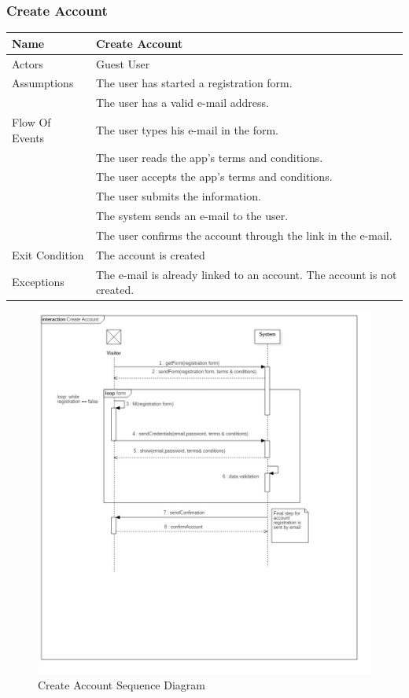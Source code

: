 \documentclass{article}
\begin{document}
\subsubsection{Create Account}
\begin{center}
\begin{tabular}{| p{3cm} || p{8cm} |}
\hline
Name & Create Account \\ \hline
Actors & Guest User \\ \hline
Assumptions & The user has started a registration form. \\ &The user has a valid e-mail address. \\ \hline
Flow Of Events & The user types his e-mail in the form. \\&The user reads the app's terms and conditions. \\& The user accepts the app's terms and conditions. \\& The user submits the information. \\& The system sends an e-mail to the user. \\& The user confirms the account through the link in the e-mail. \\ \hline
Exit Condition & The account is created \\ \hline
Exceptions & The e-mail is already linked to an account. The account is not created. \\
\hline
\end{tabular}
\end{center}
\begin{figure}[H]
\includegraphics[width=\linewidth]{Create_Account.jpg}
\caption{Create Account Sequence Diagram}
\label{fig:SQ1}
\end{figure}
\end{document}
